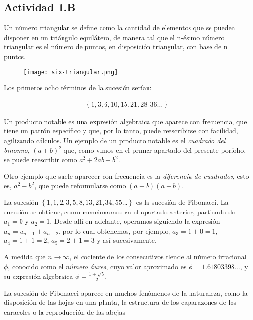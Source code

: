 \subsection*{Actividad 1.B}

Un número triangular se define como la cantidad de elementos que se 
pueden disponer en un triángulo equilátero,
de manera tal que el n-ésimo número triangular es el número de puntos,
en disposición triangular,
con base de n puntos.

\begin{figure}[h]
    \centering
    \texttt{[image: six-triangular.png]}
\end{figure}

Los primeros ocho términos de la sucesión serían:

\begin{align*}
    \left\{1,3,6,10,15,21,28,36 \dots\right\}
\end{align*}

Un producto notable es una expresión algebraica que aparece con frecuencia,
que tiene un patrón específico y que, por lo tanto,
puede reescribirse con facilidad, agilizando cálculos.
Un ejemplo de un producto notable es el \textit{cuadrado del binomio},
\((a+b)^2\) que,
como vimos en el primer apartado del presente porfolio,
se puede reescribir como \(a^2 + 2ab + b^2\).

Otro ejemplo que suele aparecer con frecuencia es la \textit{diferencia de cuadrados},
esto es,
\(a^2 - b^2\),
que puede reformularse como \((a-b)(a+b)\).

La sucesión \(\left\{1,1,2,3,5,8,13,21,34,55 \dots\right\}\) es la 
sucesión de Fibonacci. La sucesión se obtiene,
como mencionamos en el apartado anterior,
partiendo de \(a_{1} = 0\) y \(a_{2} = 1\).
Desde allí en adelante,
operamos siguiendo la expresión \(a_{n} = a_{n-1} + a_{n-2}\),
por lo cual obtenemos,
por ejemplo,
\(a_{3} = 1 + 0 = 1\),
\(a_{4} = 1 + 1 = 2\),
\(a_{5} = 2 + 1 = 3\) y así sucesivamente.

A medida que \(n \to \infty\), 
el cociente de los consecutivos tiende al número irracional \(\phi\),
conocido como el \textit{número áureo},
cuyo valor aproximado es \(\phi = 1.61803398\dots\),
y su expresión algebraica \(\phi = \frac{1+\sqrt{5}}{2}\).

La sucesión de Fibonacci aparece en muchos fenómenos de la naturaleza,
como la disposición de las hojas en una planta,
la estructura de los caparazones de los caracoles
o la reproducción de las abejas.
